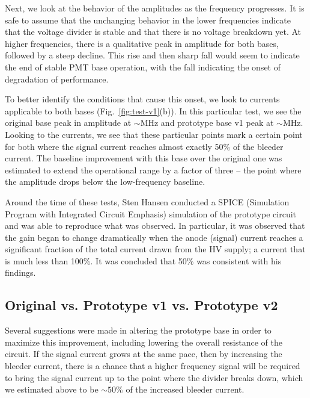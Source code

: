 Next, we look at the behavior of the amplitudes as the frequency progresses. It is safe to assume that the unchanging behavior in the lower frequencies indicate that the voltage divider is stable and that there is no voltage breakdown yet. At higher frequencies, there is a qualitative peak in amplitude for both bases, followed by a steep decline. This rise and then sharp fall would seem to indicate the end of stable PMT base operation, with the fall indicating the onset of degradation of performance.

To better identify the conditions that cause this onset, we look to currents applicable to both bases (Fig.~\ref{fig:test-v1}(b)). In this particular test, we see the original base peak in amplitude at $\sim$\unit[4]{MHz} and prototype base v1 peak at $\sim$\unit[10]{MHz}. Looking to the currents, we see that these particular points mark a certain point for both where the signal current reaches almost exactly 50\% of the bleeder current. The baseline improvement with this base over the original one was estimated to extend the operational range by a factor of three -- the point where the amplitude drops below the low-frequency baseline.

Around the time of these tests, Sten Hansen conducted a SPICE (Simulation Program with Integrated Circuit Emphasis) simulation of the prototype circuit and was able to reproduce what was observed. In particular, it was observed that the gain began to change dramatically when the anode (signal) current reaches a significant fraction of the total current drawn from the HV supply; a current that is much less than 100\%. It was concluded that 50\% was consistent with his findings.

\subsection{Original vs. Prototype v1 vs. Prototype v2}

Several suggestions were made in altering the prototype base in order to maximize this improvement, including lowering the overall resistance of the circuit. If the signal current grows at the same pace, then by increasing the bleeder current, there is a chance that a higher frequency signal will be required to bring the signal current up to the point where the divider breaks down, which we estimated above to be $\sim 50\%$ of the increased bleeder current.

